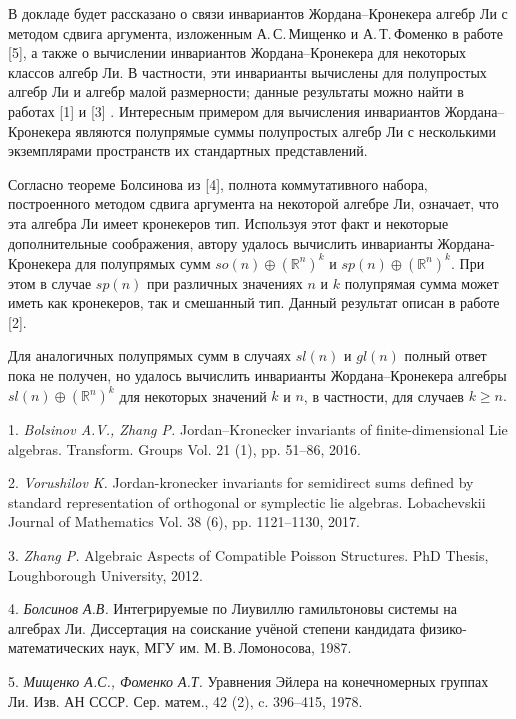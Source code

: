 


\vzmscaption

В докладе будет рассказано о связи инвариантов Жорда\-на--Кронекера алгебр Ли с методом сдвига аргумента, изложенным А.\,С.\,Мищенко и А.\,Т.\,Фоменко в работе [5], а также о вычислении инвариантов Жордана--Кронекера для некоторых классов алгебр Ли. В частности, эти инварианты вычислены для полупростых алгебр Ли и алгебр малой размерности; данные результаты можно найти в работах [1] и [3] . Интересным примером для вычисления инвариантов Жордана--Кронекера являются полупрямые суммы полупростых алгебр Ли с несколькими экземплярами пространств их стандартных представлений.

Согласно теореме Болсинова из [4], полнота коммутативного набора, построенного методом сдвига аргумента на некоторой алгебре Ли, означает, что эта алгебра Ли имеет кронекеров тип. Используя этот факт и некоторые дополнительные соображения, автору удалось вычислить инварианты Жордана-Кронекера для полупрямых сумм  $so(n)\oplus (\mathbb{R}^n)^k$ и  $sp(n)\oplus (\mathbb{R}^n)^k.$ При этом в случае $sp(n)$ при различных значениях $n$ и $k$ полупрямая сумма может иметь как кронекеров, так и смешанный тип. Данный результат описан в работе [2].

Для аналогичных полупрямых сумм в случаях $sl(n)$ и $gl(n)$ полный ответ пока не получен, но удалось вычислить инварианты Жордана--Кронекера алгебры $sl(n)\oplus (\mathbb{R}^n)^k$ для некоторых значений $k$ и $n$, в частности, для случаев $k\geqslant n.$



\litlist

1. {\it Bolsinov A.V., Zhang P.} Jordan–Kronecker invariants of finite-dimensional Lie algebras. Transform. Groups Vol. 21 (1), pp. 51--86, 2016.

2. {\it Vorushilov K.} Jordan-kronecker invariants for semidirect sums defined by standard representation of orthogonal or symp\-lec\-tic lie algebras. Lobachevskii Journal of Mathematics Vol. 38 (6), pp. 1121--1130, 2017.

3. {\it Zhang P.} Algebraic Aspects of Compatible Poisson Struc\-tures. PhD Thesis, Loughborough University, 2012.

4. {\it Болсинов А.В.} Интегрируемые по Лиувиллю гамильтоновы системы на алгебрах Ли. Диссертация на соискание учёной степени кандидата физико-математических наук, МГУ им. М.\,В.\,Ломоносова, 1987.

5. {\it Мищенко А.С., Фоменко А.Т.} Уравнения Эйлера на конечномерных группах Ли. Изв. АН СССР. Сер. матем., 42 (2), c. 396–415, 1978.


